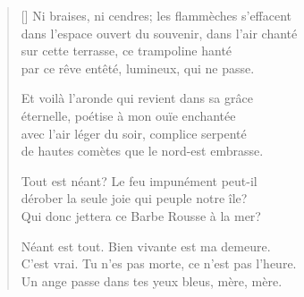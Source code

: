 



\settowidth{\versewidth}{C'est vrai. Tu n'es pas morte, ce n'est pas l'heure.}

\bigskip

\begin{verse}[\versewidth]
Ni braises, ni cendres; les flammèches s'effacent \\
dans l'espace ouvert du souvenir, dans l'air chanté \\
sur cette terrasse, ce trampoline hanté \\
par ce rêve entêté, lumineux, qui ne passe.

Et voilà l'aronde qui revient dans sa grâce \\
éternelle, poétise à mon ouïe enchantée \\
avec l'air léger du soir, complice serpenté \\
de hautes comètes que le nord-est embrasse.

Tout est néant? Le feu impunément peut-il \\
dérober la seule joie qui peuple notre île? \\
Qui donc jettera ce Barbe Rousse à la mer?

Néant est tout. Bien vivante est ma demeure. \\
C'est vrai. Tu n'es pas morte, ce n'est pas l'heure. \\
Un ange passe dans tes yeux bleus, mère, mère.
\end{verse}

\bigskip \bigskip

\cleardoublepage



\settowidth{\versewidth}{A ese alado ladrón, ?`no hay quién le ladre?}

\bigskip

